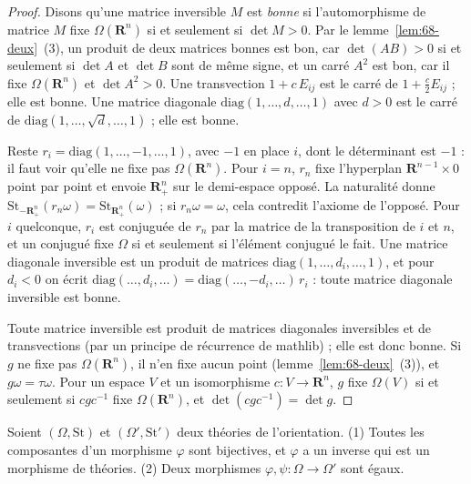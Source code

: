 \begin{proof}
Disons qu'une matrice inversible $M$ est \emph{bonne} si l'automorphisme de matrice $M$ fixe $\Omega(\mathbf R^n)$ si et seulement si $\det M > 0$. Par le lemme~\ref{lem:68-deux}~(3), un produit de deux matrices bonnes est bon, car $\det(AB) > 0$ si et seulement si $\det A$ et $\det B$ sont de même signe, et un carré $A^2$ est bon, car il fixe $\Omega(\mathbf R^n)$ et $\det A^2 > 0$. Une transvection $1 + c\,E_{ij}$ est le carré de $1 + \tfrac c2 E_{ij}$ ; elle est bonne. Une matrice diagonale $\mathrm{diag}(1, \ldots, d, \ldots, 1)$ avec $d > 0$ est le carré de $\mathrm{diag}(1, \ldots, \sqrt d, \ldots, 1)$ ; elle est bonne.

Reste $r_i = \mathrm{diag}(1, \ldots, -1, \ldots, 1)$, avec $-1$ en place $i$, dont le déterminant est $-1$ : il faut voir qu'elle ne fixe pas $\Omega(\mathbf R^n)$. Pour $i = n$, $r_n$ fixe l'hyperplan $\mathbf R^{n-1} \times 0$ point par point et envoie $\mathbf R^n_+$ sur le demi-espace opposé. La naturalité donne $\mathrm{St}_{-\mathbf R^n_+}(r_n\omega) = \mathrm{St}_{\mathbf R^n_+}(\omega)$ ; si $r_n\omega = \omega$, cela contredit l'axiome de l'opposé. Pour $i$ quelconque, $r_i$ est conjuguée de $r_n$ par la matrice de la transposition de $i$ et $n$, et un conjugué fixe $\Omega$ si et seulement si l'élément conjugué le fait. Une matrice diagonale inversible est un produit de matrices $\mathrm{diag}(1, \ldots, d_i, \ldots, 1)$, et pour $d_i < 0$ on écrit $\mathrm{diag}(\ldots, d_i, \ldots) = \mathrm{diag}(\ldots, -d_i, \ldots)\,r_i$ : toute matrice diagonale inversible est bonne.

Toute matrice inversible est produit de matrices diagonales inversibles et de transvections (par un principe de récurrence de mathlib) ; elle est donc bonne. Si $g$ ne fixe pas $\Omega(\mathbf R^n)$, il n'en fixe aucun point (lemme~\ref{lem:68-deux}~(3)), et $g\omega = \tau\omega$. Pour un espace $V$ et un isomorphisme $c : V \to \mathbf R^n$, $g$ fixe $\Omega(V)$ si et seulement si $c g c^{-1}$ fixe $\Omega(\mathbf R^n)$, et $\det(c g c^{-1}) = \det g$.
\end{proof}

\begin{encadre}
\begin{theoreme}
Soient $(\Omega, \mathrm{St})$ et $(\Omega', \mathrm{St}')$ deux théories de l'orientation. (1) Toutes les composantes d'un morphisme $\varphi$ sont bijectives, et $\varphi$ a un inverse qui est un morphisme de théories. (2) Deux morphismes $\varphi, \psi : \Omega \to \Omega'$ sont égaux.
\end{theoreme}
\end{encadre}

